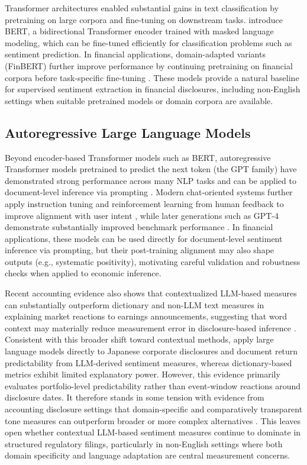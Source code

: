 Transformer architectures enabled substantial gains in text classification by pretraining on large corpora and fine-tuning on downstream tasks. \citet{devlin2019bert} introduce BERT, a bidirectional Transformer encoder trained with masked language modeling, which can be fine-tuned efficiently for classification problems such as sentiment prediction. In financial applications, domain-adapted variants (FinBERT) further improve performance by continuing pretraining on financial corpora before task-specific fine-tuning \citep{yang2020finbert}. These models provide a natural baseline for supervised sentiment extraction in financial disclosures, including non-English settings when suitable pretrained models or domain corpora are available.

\subsection{Autoregressive Large Language Models}

Beyond encoder-based Transformer models such as BERT, autoregressive Transformer models pretrained to predict the next token (the GPT family) have demonstrated strong performance across many NLP tasks and can be applied to document-level inference via prompting \citep{radford2018improving}. Modern chat-oriented systems further apply instruction tuning and reinforcement learning from human feedback to improve alignment with user intent \citep{ouyang2022instructgpt}, while later generations such as GPT-4 demonstrate substantially improved benchmark performance \citep{openai2023gpt4}. In financial applications, these models can be used directly for document-level sentiment inference via prompting, but their post-training alignment may also shape outputs (e.g., systematic positivity), motivating careful validation and robustness checks when applied to economic inference.

Recent accounting evidence also shows that contextualized LLM-based measures can substantially outperform dictionary and non-LLM text measures in explaining market reactions to earnings announcements, suggesting that word context may materially reduce measurement error in disclosure-based inference \citep{siano2025news}. Consistent with this broader shift toward contextual methods, \citet{okada2025words} apply large language models directly to Japanese corporate disclosures and document return predictability from LLM-derived sentiment measures, whereas dictionary-based metrics exhibit limited explanatory power. However, this evidence primarily evaluates portfolio-level predictability rather than event-window reactions around disclosure dates. It therefore stands in some tension with evidence from accounting disclosure settings that domain-specific and comparatively transparent tone measures can outperform broader or more complex alternatives \citep{henry2016measuring}. This leaves open whether contextual LLM-based sentiment measures continue to dominate in structured regulatory filings, particularly in non-English settings where both domain specificity and language adaptation are central measurement concerns.


